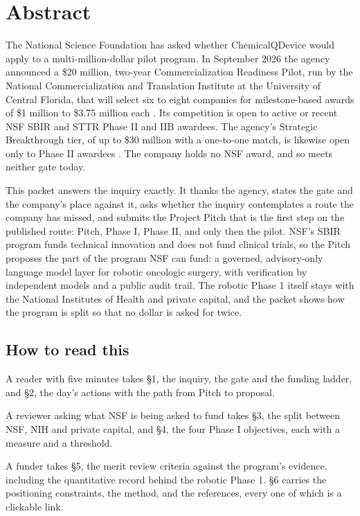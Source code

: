 \section*{Abstract}

The National Science Foundation has asked whether ChemicalQDevice would apply to
a multi-million-dollar pilot program. In September 2026 the agency announced a
\$20 million, two-year Commercialization Readiness Pilot, run by the National
Commercialization and Translation Institute at the University of Central
Florida, that will select six to eight companies for milestone-based awards of
\$1 million to \$3.75 million each \cite{nsfncti2026,nctiucf2026}. Its competition
is open to active or recent NSF SBIR and STTR Phase II and IIB awardees. The
agency's Strategic Breakthrough tier, of up to \$30 million with a one-to-one
match, is likewise open only to Phase II awardees \cite{nsf26510}. The company
holds no NSF award, and so meets neither gate today.

This packet answers the inquiry exactly. It thanks the agency, states the gate
and the company's place against it, asks whether the inquiry contemplates a
route the company has missed, and submits the Project Pitch that is the first
step on the published route: Pitch, Phase I, Phase II, and only then the pilot.
NSF's SBIR program funds technical innovation and does not fund clinical
trials, so the Pitch proposes the part of the program NSF can fund: a governed,
advisory-only language model layer for robotic oncologic surgery, with
verification by independent models and a public audit trail. The robotic
Phase 1 itself stays with the National Institutes of Health and private capital,
and the packet shows how the program is split so that no dollar is asked for
twice.

\subsection*{How to read this}

A reader with five minutes takes \S1, the inquiry, the gate and the funding
ladder, and \S2, the day's actions with the path from Pitch to proposal.

A reviewer asking what NSF is being asked to fund takes \S3, the split between
NSF, NIH and private capital, and \S4, the four Phase I objectives, each with a
measure and a threshold.

A funder takes \S5, the merit review criteria against the program's evidence,
including the quantitative record behind the robotic Phase 1. \S6 carries the
positioning constraints, the method, and the references, every one of which is
a clickable link.
